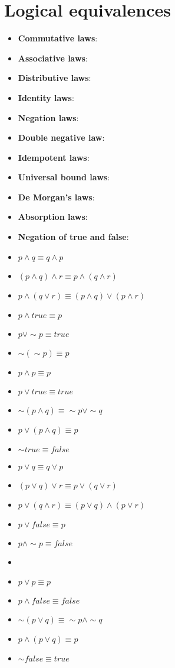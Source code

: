 \documentclass[a4paper]{article}
\begin{document}
\section{Logical equivalences}
\begin{multicols}{3}
\begin{itemize}
	\item[] \textbf{Commutative laws}:
	\item[] \textbf{Associative laws}:
	\item[] \textbf{Distributive laws}:
	\item[] \textbf{Identity laws}:
	\item[] \textbf{Negation laws}:
	\item[] \textbf{Double negative law}:
	\item[] \textbf{Idempotent laws}:
	\item[] \textbf{Universal bound laws}:
	\item[] \textbf{De Morgan's laws}:
	\item[] \textbf{Absorption laws}:
	\item[] \textbf{Negation of true and false}:
\end{itemize}
\columnbreak
\begin{itemize}
	\item[] $p \land q \equiv q \land p$
	\item[] $(p \land q) \land r \equiv p \land (q \land r)$
	\item[] $p \land (q \lor r) \equiv (p \land q) \lor (p \land r)$
	\item[] $p \land true \equiv p$
	\item[] $p \lor \sim p \equiv true$
	\item[] $\sim (\sim p) \equiv p$
	\item[] $p \land p \equiv p$
	\item[] $p \lor true \equiv true$
	\item[] $\sim(p \land q) \equiv \sim p \lor \sim q$
	\item[] $p \lor (p \land q) \equiv p$
	\item[] $\sim true \equiv false$
\end{itemize}
\columnbreak
\begin{itemize}
	\item[] $p \lor q \equiv q \lor p$
	\item[] $(p \lor q) \lor r \equiv p \lor (q \lor r)$
	\item[] $p \lor (q \land r) \equiv (p \lor q) \land (p \lor r)$
	\item[] $p \lor false \equiv p$
	\item[] $p \land \sim p \equiv false$
	\item[]
	\item[] $p \lor p \equiv p$
	\item[] $p \land false \equiv false$
	\item[] $\sim(p \lor q) \equiv \sim p \land \sim q$
	\item[] $p \land (p \lor q) \equiv p$
	\item[] $\sim false \equiv true$
\end{itemize}
\end{multicols}
\end{document}
